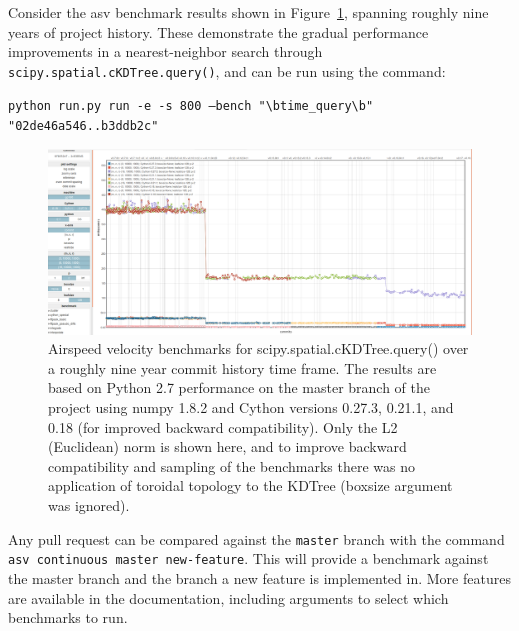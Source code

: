 \documentclass[fleqn,10pt]{wlscirep}
\begin{document}
    Consider the asv benchmark results shown in Figure~\ref{fig:asvbench}, spanning roughly nine years of project history. These demonstrate the gradual performance
    improvements in a nearest-neighbor search through \texttt{scipy.spatial.cKDTree.query()}, and can be run using the command:


    \texttt{python run.py run -e -s 800 --bench "\textbackslash btime\_query\textbackslash b" "02de46a546..b3ddb2c"}

    \begin{figure}[H]
        \centering
        \includegraphics[width=\textwidth]{static/asv_time_query_ckdtree}
        \caption{Airspeed velocity benchmarks for scipy.spatial.cKDTree.query() over a roughly nine year commit history time frame. The results are based on Python 2.7 performance on the master branch of the project using numpy 1.8.2 and Cython versions 0.27.3, 0.21.1, and 0.18 (for improved backward compatibility). Only the L2 (Euclidean) norm is shown here, and to improve backward compatibility and sampling of the benchmarks there was no application of toroidal topology to the KDTree (boxsize argument was ignored).}
        \label{fig:asvbench}
    \end{figure}

   Any pull request can be compared against the \texttt{master} branch with the command \texttt{asv continuous master new-feature}. This will provide a benchmark against the master branch and the branch a new feature is implemented in. More features are available in the documentation, including arguments to select which benchmarks to run.
\end{document}

